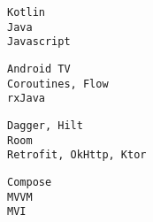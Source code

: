 \documentclass[9pt]{developercv} %
\begin{document}


\begin{minipage}[t]{0.28\textwidth}
	\vspace{-\baselineskip} %
	\texttt{Kotlin}\\
	\texttt{Java}\\
	\texttt{Javascript}\\
\end{minipage}
\hfill
\begin{minipage}[t]{0.28\textwidth}
	\vspace{-\baselineskip} %
		
	\texttt{Android TV}\\
	\texttt{Coroutines, Flow}\\
	\texttt{rxJava}\\
	
\end{minipage}
\hfill
\begin{minipage}[t]{0.28\linewidth}
	\vspace{-\baselineskip} %
		
	\texttt{Dagger, Hilt}\\
	\texttt{Room}\\
	\texttt{Retrofit, OkHttp, Ktor}\\
\end{minipage}
\hfill
\begin{minipage}[t]{0.08\textwidth}
	\vspace{-\baselineskip} %
		
	\texttt{Compose}\\
	\texttt{MVVM}\\
	\texttt{MVI}\\
\end{minipage}


\end{document}

